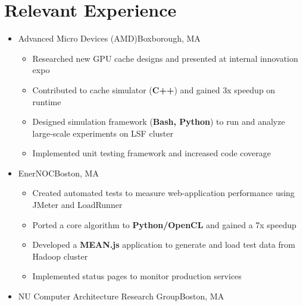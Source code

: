 \documentclass[11pt,letterpaper,sans]{moderncv}
\begin{document}
\section{Relevant Experience}

\vspace{6pt}

\begin{itemize}


\item[] {
{Advanced Micro Devices (AMD)}{Boxborough, MA}{}{\vspace{3pt}}
\vspace{-3mm}	\begin{itemize}
	 \item Researched new GPU cache designs and presented at internal innovation expo
	 \item Contributed to cache simulator (\textbf{C++}) and gained 3x speedup on runtime
	 \item Designed simulation framework (\textbf{Bash, Python}) to run and analyze large-scale experiments on LSF cluster
	 \item Implemented unit testing framework and increased code coverage
	\end{itemize}
}
\vspace{6pt}

\item[] {
{EnerNOC}{Boston, MA}{}{\vspace{3pt}}
\vspace{-3mm}	\begin{itemize}
	 \item Created automated tests to measure 
web-application performance using JMeter and LoadRunner
	 \item Ported a core algorithm to \textbf{Python/OpenCL} and gained a 7x speedup
	 \item Developed a \textbf{MEAN.js} application to generate and load test data from Hadoop cluster
	 \item Implemented status pages to monitor production services

	\end{itemize}
}
\vspace{6pt}


\item[] {
{NU Computer Architecture Research Group}{Boston, MA}{}{\vspace{3pt}}
\vspace{-3mm}	\begin{itemize}
	

\end{itemize}}
\end{itemize}
\end{document}
